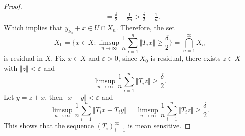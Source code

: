 \documentclass[10pt,a4paper]{amsart}
\begin{document}
\begin{proof}
\begin{align*}
         & =\frac{\delta}{2} + \frac{1}{2n} > \frac{\delta}{2}-\frac{1}{n}.
    \end{align*}
    Which implies that $y_{k_0}+x\in U\cap X_n$.
    Therefore, the set
    \[
        X_0= \biggl\{x\in X: \limsup_{n\to \infty} \frac{1}{n}\sum_{i=1}^{n}\Vert T_ix \Vert \ge \frac{\delta}{2} \biggr\} =\bigcap_{n=1}^{\infty}X_n
    \]
    is residual in $X$.
    Fix $x\in X$ and $\varepsilon>0$,
    since $X_0$ is residual, there exists $z\in X$ with $\Vert z \Vert <\varepsilon$ and
    \[
        \limsup_{n\to \infty} \frac{1}{n}\sum_{i=1}^{n}\Vert T_iz \Vert \ge \frac{\delta}{2}.
    \]
    Let $y=z+x$, then $\Vert x-y \Vert <\varepsilon$ and
    \[
        \limsup_{n\to \infty} \frac{1}{n}\sum_{i=1}^{n}\Vert T_ix -T_iy\Vert =\limsup_{n\to \infty} \frac{1}{n}\sum_{i=1}^{n}\Vert T_iz \Vert \ge \frac{\delta}{2}.
    \]
    This shows that the sequence $(T_i)_{i=1}^{\infty}$ is mean sensitive.
\end{proof}
\end{document}
